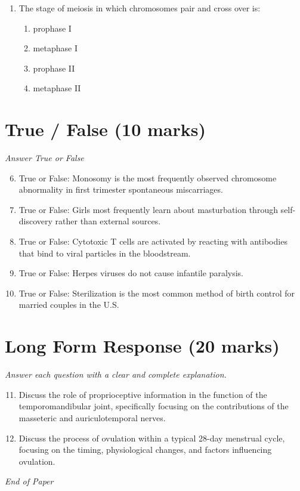 \documentclass[12pt]{article}
\begin{document}
\begin{enumerate}[label=\arabic*.]
\begin{enumerate}[label=(\alph*)]
    \item Microsatellites
    \item Minisatellites
    \item Satellites
\end{enumerate}
\item The stage of meiosis in which chromosomes pair and cross over is:
\begin{enumerate}[label=(\alph*)]
    \item prophase I
    \item metaphase I
    \item prophase II
    \item metaphase II
\end{enumerate}
\end{enumerate}

\section*{True / False (10 marks)}
\textit{Answer True or False}
\begin{enumerate}[label=\arabic*.]
\setcounter{enumi}{5}
\item True or False: Monosomy is the most frequently observed chromosome abnormality in first trimester spontaneous miscarriages.
\item True or False: Girls most frequently learn about masturbation through self-discovery rather than external sources.
\item True or False: Cytotoxic T cells are activated by reacting with antibodies that bind to viral particles in the bloodstream.
\item True or False: Herpes viruses do not cause infantile paralysis.
\item True or False: Sterilization is the most common method of birth control for married couples in the U.S.
\end{enumerate}

\section*{Long Form Response (20 marks)}
\textit{Answer each question with a clear and complete explanation.}
\begin{enumerate}[label=\arabic*.]
\setcounter{enumi}{10}
\item Discuss the role of proprioceptive information in the function of the temporomandibular joint, specifically focusing on the contributions of the masseteric and auriculotemporal nerves.
\item Discuss the process of ovulation within a typical 28-day menstrual cycle, focusing on the timing, physiological changes, and factors influencing ovulation.
\end{enumerate}

\vfill
\noindent\textit{End of Paper}
\end{document}
